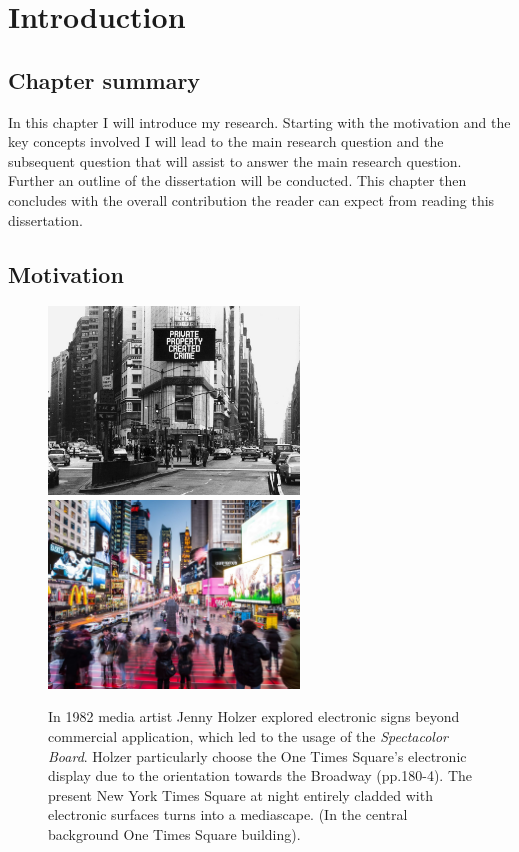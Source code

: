 

\chapter{Introduction}

\label{chapterlabel2}

\section*{Chapter summary} 

In this chapter I will introduce my research. Starting with the motivation and the key concepts involved I will lead to the main research question and the subsequent question that will assist to answer the main research question. Further an outline of the dissertation will be conducted. This chapter then concludes with the overall contribution the reader can expect from reading this dissertation.\newpage



\section{Motivation}


\begin{figure}[!b] 
\centering
\includegraphics[height=5cm]{Illustrations/Spectacolor_JennyHolzer_.jpg}
\includegraphics[height=5cm]{Illustrations/TimesSquare.jpg}
\caption [New York Times Square in 20XX] {In 1982 media artist Jenny Holzer  explored electronic signs beyond commercial application, which led to the usage of the \textit{Spectacolor Board}. Holzer particularly choose the One Times Square's electronic display due to the orientation towards the Broadway \cite{Tate_1988} (pp.180-4). The present New York Times Square at night entirely cladded with electronic surfaces turns into a mediascape. (In the central background One Times Square building).}
\label{TimesSquare}
\end{figure}

